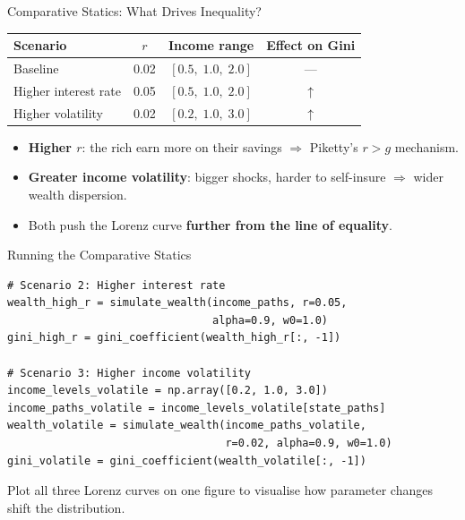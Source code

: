 \documentclass[aspectratio=169, 10pt]{beamer}
\begin{document}
\begin{frame}{Comparative Statics: What Drives Inequality?}
\begin{center}
\begin{tabular}{lccc}
\toprule
Scenario & $r$ & Income range & Effect on Gini \\
\midrule
Baseline            & 0.02 & $[0.5,\; 1.0,\; 2.0]$ & --- \\
Higher interest rate & 0.05 & $[0.5,\; 1.0,\; 2.0]$ & $\uparrow$ \\
Higher volatility   & 0.02 & $[0.2,\; 1.0,\; 3.0]$ & $\uparrow$ \\
\bottomrule
\end{tabular}
\end{center}
\vspace{0.5em}
\begin{itemize}
  \item \textbf{Higher $r$}: the rich earn more on their savings
        $\Rightarrow$ Piketty's $r > g$ mechanism.
  \item \textbf{Greater income volatility}: bigger shocks, harder to
        self-insure $\Rightarrow$ wider wealth dispersion.
  \item Both push the Lorenz curve \textbf{further from the line of equality}.
\end{itemize}
\end{frame}

\begin{frame}[fragile]{Running the Comparative Statics}
\begin{lstlisting}
# Scenario 2: Higher interest rate
wealth_high_r = simulate_wealth(income_paths, r=0.05,
                                alpha=0.9, w0=1.0)
gini_high_r = gini_coefficient(wealth_high_r[:, -1])

# Scenario 3: Higher income volatility
income_levels_volatile = np.array([0.2, 1.0, 3.0])
income_paths_volatile = income_levels_volatile[state_paths]
wealth_volatile = simulate_wealth(income_paths_volatile,
                                  r=0.02, alpha=0.9, w0=1.0)
gini_volatile = gini_coefficient(wealth_volatile[:, -1])
\end{lstlisting}
\vspace{0.3em}
Plot all three Lorenz curves on one figure to visualise how parameter
changes shift the distribution.
\end{frame}
\end{document}
